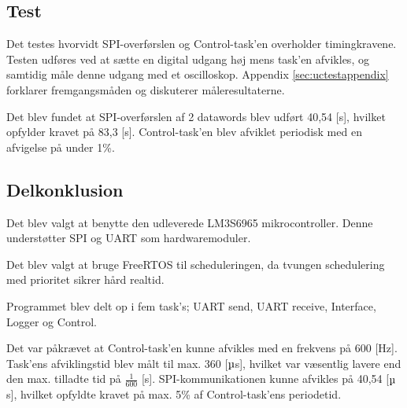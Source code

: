 
\subsection{Test} 
Det testes hvorvidt SPI-overførslen og Control-task'en overholder timingkravene. 
Testen udføres ved at sætte en digital udgang høj mens task'en afvikles, og samtidig måle denne udgang med et oscilloskop. 
Appendix \ref{sec:uctestappendix} forklarer fremgangsmåden og diskuterer måleresultaterne. 


Det blev fundet at SPI-overførslen af 2 datawords blev udført 40,54 [\micro s], hvilket opfylder kravet på 83,3 [\micro s]. 
Control-task'en blev afviklet periodisk med en afvigelse på under 1\%. 


\subsection{Delkonklusion}
Det blev valgt at benytte den udleverede LM3S6965 mikrocontroller.
Denne understøtter SPI og UART som hardwaremoduler. 

Det blev valgt at bruge FreeRTOS til scheduleringen,
da tvungen schedulering med prioritet sikrer hård realtid. 

Programmet blev delt op i fem task's; UART send, UART receive, Interface, Logger og Control. 

Det var påkrævet at Control-task'en kunne afvikles med en frekvens på 600 [Hz]. 
Task'ens afviklingstid blev målt til max. 360 [\(\micro\)s], hvilket var væsentlig lavere end den max. tilladte tid på \(\frac{1}{600}\) [s]. 
SPI-kommunikationen kunne afvikles på 40,54 [\(\micro\)s], hvilket opfyldte kravet på max. 5\% af Control-task'ens periodetid. 


